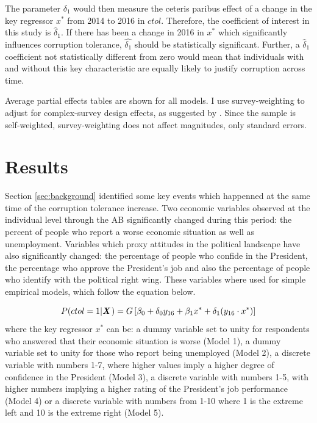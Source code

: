 \documentclass[12pt,a4]{article}\usepackage[]{graphicx}\usepackage[]{xcolor}
\begin{document}
The parameter $\delta_1$ would then measure the ceteris paribus effect of a change in the key regressor $x^*$ from 2014 to 2016 in $ctol$. Therefore, the coefficient of interest in this study is $\widehat{\delta}_1$. If there has been a change in 2016 in $x^*$ which significantly influences corruption tolerance, $\widehat{\delta_1}$ should be statistically significant. Further, a $\widehat{\delta}_1$ coefficient not statistically different from zero would mean that individuals with and without this key characteristic are equally likely to justify corruption across time. 

Average partial effects tables are shown for all models. I use survey-weighting to adjust for complex-survey design effects, as suggested by \textcite{Castorena.2021}. Since the sample is self-weighted, survey-weighting does not affect magnitudes, only standard errors.




\section{Results}
\label{sec:results}
Section \ref{sec:background} identified some key events which happenned at the same time of the corruption tolerance increase. Two economic variables observed at the individual level through the AB significantly changed during this period: the percent of people who report a worse economic situation as well as unemployment. Variables which proxy attitudes in the political landscape have also significantly changed: the percentage of people who confide in the President, the percentage who approve the President's job and also the percentage of people who identify with the political right wing. These variables where used for simple empirical models, which follow the equation below.

\begin{equation}
\label{eqn:simplemod}
P(ctol = 1 | \textbf{\textit{X}} \hspace{0.04cm}) = G \left[ \beta_0 + \delta_0 y_{16} + \beta_1 x^* + \delta_1 (y_{16} \cdot x^*)\right]
\end{equation}
where the key regressor $x^*$ can be: a dummy variable set to unity for respondents who answered that their economic situation is worse (Model 1), a dummy variable set to unity for those who report being unemployed (Model 2), a discrete variable with numbers 1-7, where higher values imply a higher degree of confidence in the President (Model 3), a discrete variable with numbers 1-5, with higher numbers implying a higher rating of the President's job performance (Model 4) or a discrete variable with numbers from 1-10 where 1 is the extreme left and 10 is the extreme right (Model 5). 
\end{document}
